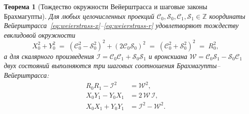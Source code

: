 \documentclass[11pt,a4paper]{article}
\theoremstyle{plain}
\newtheorem{theorem}{Теорема}[section]
\theoremstyle{definition}
\begin{document}
\begin{theorem}[Тождество окружности Вейерштрасса и шаговые законы Брахмагупты]
\label{thm:main-1b}
Для любых целочисленных проекций $\mathcal{C}_0, \mathcal{S}_0, \mathcal{C}_1, \mathcal{S}_1 \in \mathbb{Z}$ координаты Вейерштрасса~\eqref{eq:weierstrass-x}--\eqref{eq:weierstrass-r} удовлетворяют тождеству евклидовой окружности
\begin{equation}
  \label{eq:weierstrass-circle-id}
  X_0^2 + Y_0^2 \;=\; (\mathcal{C}_0^2 - \mathcal{S}_0^2)^2 + (2\mathcal{C}_0\mathcal{S}_0)^2 \;=\; (\mathcal{C}_0^2 + \mathcal{S}_0^2)^2 \;=\; R_0^2,
\end{equation}
а для скалярного произведения $\mathcal{I} = \mathcal{C}_0\mathcal{C}_1 + \mathcal{S}_0\mathcal{S}_1$ и вронскиана $\mathcal{W} = \mathcal{C}_0\mathcal{S}_1 - \mathcal{S}_0\mathcal{C}_1$ двух состояний выполняются три шаговых соотношения Брахмагупты--Вейерштрасса:
\begin{align}
  R_0 R_1 - \mathcal{I}^2 &= \mathcal{W}^2, \label{eq:brahmagupta-step-1} \\
  X_0 Y_1 - Y_0 X_1 &= 2\,\mathcal{W}\,\mathcal{I}, \label{eq:brahmagupta-step-2} \\
  X_0 X_1 + Y_0 Y_1 &= \mathcal{I}^2 - \mathcal{W}^2. \label{eq:brahmagupta-step-3}
\end{align}
\end{theorem}
\end{document}
